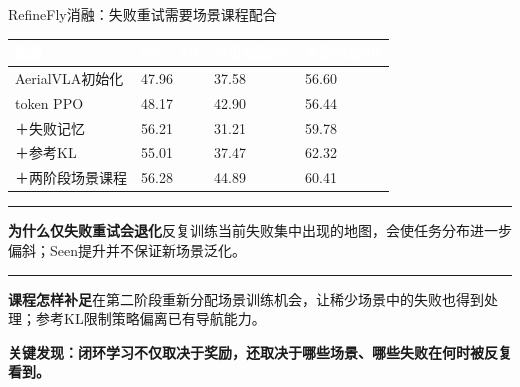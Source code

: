 \documentclass[aspectratio=169,10pt]{beamer}
\def\slidesource{}
\newcommand{\takeaway}[1]{\par\begin{takebox}\fontsize{9.1}{11.5}\selectfont\bfseries\color{navy}#1\end{takebox}}
\newcommand{\ph}[1]{{\color{teal}\rule[-0.35mm]{0.8mm}{3.1mm}}\hspace{1.1mm}\textbf{\color{navy}#1}}
\newcommand{\thd}[1]{\textcolor{white}{\bfseries #1}}
\newcommand{\bline}[2]{\par\ph{#1}\quad #2\par\vspace{1.5mm}}
\begin{document}
\begin{frame}[t,label=refinefly_ablation]{RefineFly消融：失败重试需要场景课程配合}
\relax
{\fontsize{8.5}{10.8}\selectfont{}
\begin{tabularx}{\linewidth}{@{}Y{1.5}Y{0.8}Y{0.85}Y{0.85}@{}}\toprule{}\thd{配置} & \thd{Seen SR} & \thd{未见地图SR} & \thd{未见对象SR}\\\midrule
AerialVLA初始化 & 47.96 & 37.58 & 56.60\\
token PPO & 48.17 & 42.90 & 56.44\\
＋失败记忆 & 56.21 & 31.21 & 59.78\\
＋参考KL & 55.01 & 37.47 & 62.32\\
＋两阶段场景课程 & 56.28 & 44.89 & 60.41\\
\bottomrule\end{tabularx}\par}
\bline{为什么仅失败重试会退化}{反复训练当前失败集中出现的地图，会使任务分布进一步偏斜；Seen提升并不保证新场景泛化。}
\bline{课程怎样补足}{在第二阶段重新分配场景训练机会，让稀少场景中的失败也得到处理；参考KL限制策略偏离已有导航能力。}\takeaway{关键发现：闭环学习不仅取决于奖励，还取决于哪些场景、哪些失败在何时被反复看到。}
\end{frame}
\gdef\slidesource{\href{https://arxiv.org/html/2606.02313v1}{[22] EG-GRPO} · §3.2–3.5；Tables 1–3}
\end{document}
